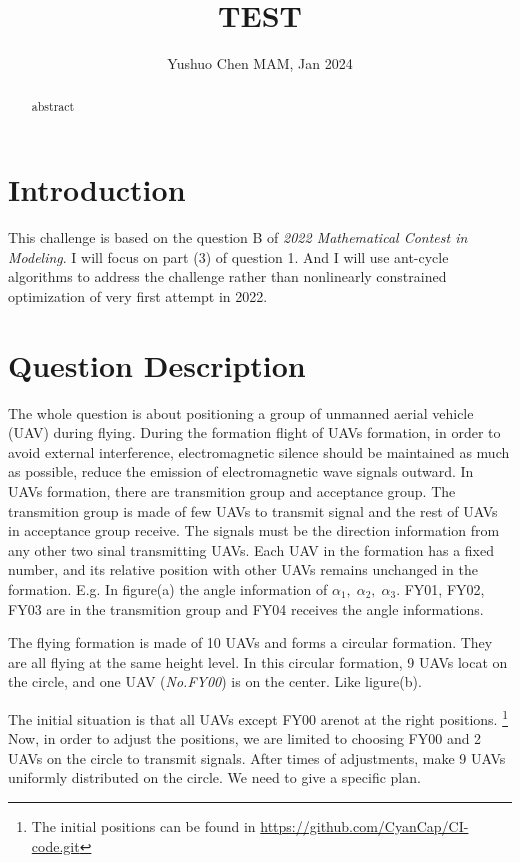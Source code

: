 \documentclass[11pt,en]{elegantpaper}
\title{TEST}
\author{Yushuo Chen MAM, Jan 2024}
\begin{document}
\maketitle

\begin{abstract}
abstract
\end{abstract}

\section{Introduction}
This challenge is based on the question B of \textit{2022 Mathematical Contest in Modeling}.
I will focus on part (3) of question 1.
And I will use ant-cycle algorithms to address the challenge rather than nonlinearly constrained optimization of very first attempt in 2022.

\section{Question Description}
The whole question is about positioning a group of unmanned aerial vehicle (UAV) during flying.
During the formation flight of UAVs formation, in order to avoid external interference, 
electromagnetic silence should be maintained as much as possible, reduce the emission of electromagnetic wave signals outward.
In UAVs formation, there are transmition group and acceptance group.
The transmition group is made of few UAVs to transmit signal and the rest of UAVs in acceptance group receive.
The signals must be the direction information from any other two sinal transmitting UAVs.
Each UAV in the formation has a fixed number, and its relative position with other UAVs remains unchanged in the formation.
E.g. In figure(a) the angle information of $\alpha_1,\;\alpha_2,\;\alpha_3$.
FY01, FY02, FY03 are in the transmition group and FY04 receives the angle informations.

\begin{figure}[htbp]
  \centering
\end{figure}

The flying formation is made of 10 UAVs and forms a circular formation.
They are all flying at the same height level. 
In this circular formation, 9 UAVs locat on the circle, and one UAV (\textit{No.FY00}) is on the center. Like ligure(b).
\par
The initial situation is that all UAVs except FY00 arenot at the right positions.
\footnote{The initial positions can be found in \url{https://github.com/CyanCap/CI-code.git}}
Now, in order to adjust the positions, we are limited to choosing FY00 and 2 UAVs on the circle to transmit signals.
After times of adjustments, make 9 UAVs uniformly distributed on the circle. 
We need to give a specific plan.
\end{document}
